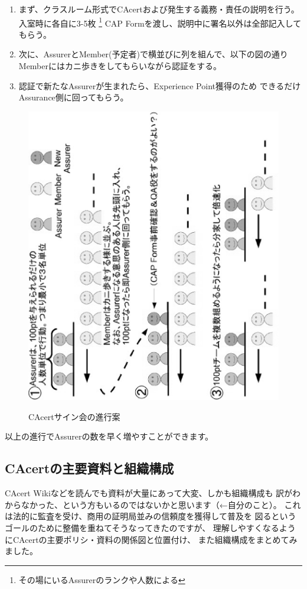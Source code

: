 \documentclass[mingoth,a4paper]{jsarticle}
\begin{document}
\begin{enumerate}
\item
まず、クラスルーム形式でCAcertおよび発生する義務・責任の説明を行う。
入室時に各自に3-5枚
\footnote{その場にいるAssurerのランクや人数による}
CAP Formを渡し、説明中に署名以外は全部記入してもらう。
\item
次に、AssurerとMember(予定者)で横並びに列を組んで、以下の図の通り
Memberにはカニ歩きをしてもらいながら認証をする。
\item
認証で新たなAssurerが生まれたら、Experience Point獲得のため
できるだけAssurance側に回ってもらう。
\end{enumerate}

\begin{figure}[H]
\begin{center}
\includegraphics[width=0.6\hsize,angle=270]{image201012/cacertparty.eps}
\label{cacertparty}
\end{center}
\caption{CAcertサイン会の進行案}
\end{figure}

以上の進行でAssurerの数を早く増やすことができます。

\subsection{CAcertの主要資料と組織構成}
CAcert Wikiなどを読んでも資料が大量にあって大変、しかも組織構成も
訳がわからなかった、という方もいるのではないかと思います（←自分のこと）。
これは法的に監査を受け、商用の証明局並みの信頼度を獲得して普及を
図るというゴールのために整備を重ねてそうなってきたのですが、
理解しやすくなるようにCAcertの主要ポリシ・資料の関係図と位置付け、
また組織構成をまとめてみました。
\end{document}
